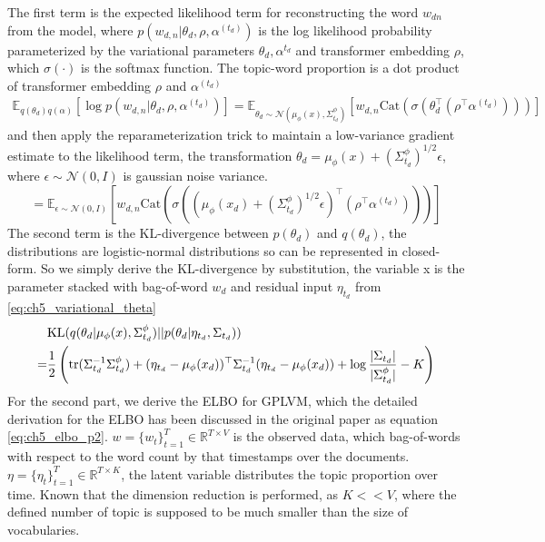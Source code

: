 The first term is the expected likelihood term for reconstructing the word $ w_{dn} $ from the model, where $ p(w_{d,n}|\theta_d, \rho,\alpha^{(t_d)}) $ is the log likelihood probability parameterized by the variational parameters $ \theta_d, \alpha^{t_d} $ and transformer embedding $ \rho $, which $ \sigma(\cdot) $ is the softmax function. The topic-word proportion is a dot product of transformer embedding $ \rho $ and $ \alpha^{(t_d)} $
\begin{align}
\mathbb{E}_{q(\theta_d)q(\alpha)}[\log p(w_{d,n}|\theta_d,\rho,\alpha^{(t_d)})]=\mathbb{E}_{\theta_d\sim\mathcal{N}(\mu_{\phi}(x),\Sigma^{\phi}_{t_d})}[w_{d,n}\text{Cat}\left(\sigma(\theta_d^\top(\rho^\top\alpha^{(t_d)}))\right)]
\end{align}
and then apply the reparameterization trick to maintain a low-variance gradient estimate to the likelihood term, the transformation $ \theta_d=\mu_{\phi}(x)+(\Sigma^{\phi}_{t_d})^{1/2}\epsilon $, where $ \epsilon\sim\mathcal{N}(0,I) $ is gaussian noise variance.
\begin{equation}\label{eq:ch5_reconstruction}
=\mathbb{E}_{\epsilon\sim\mathcal{N}(0,I)}\left[w_{d,n}\text{Cat}\left(\sigma((\mu_{\phi}(x_d)+(\Sigma^{\phi}_{t_d})^{1/2}\epsilon)^\top(\rho^\top\alpha^{(t_d)}))\right)\right]
\end{equation}
The second term is the KL-divergence between $ p(\theta_d) $ and $ q(\theta_d) $, the distributions are logistic-normal distributions so can be represented in closed-form. So we simply derive the KL-divergence by substitution,
the variable x is the parameter stacked with bag-of-word $ w_d $ and residual input $ \eta_{t_d} $ from \ref{eq:ch5_variational_theta}
\begin{align}\label{eq:ch5_kl_theta}
&\text{KL}(q(\theta_d|\mu_{\phi}(x),\Sigma^{\phi}_{t_d})||p(\theta_d|\eta_{t_d},\Sigma_{t_d}))\notag\\
=&\frac{1}{2}\left(\text{tr}(\Sigma_{t_d}^{-1}\Sigma_{t_d}^{\phi})+(\eta_{t_d}-\mu_{\phi}(x_d))^\top\Sigma_{t_d}^{-1}(\eta_{t_d}-\mu_{\phi}(x_d))+\log\frac{|\Sigma_{t_d}|}{|\Sigma^{\phi}_{t_d}|}-K\right)
\end{align}
For the second part, we derive the ELBO for GPLVM, which the detailed derivation for the ELBO has been discussed in the original paper \cite{titsias_bayesian_2010} as equation \ref{eq:ch5_elbo_p2}. $ w=\{w_t\}^{T}_{t=1}\in\mathbb{R}^{T\times V} $ is the observed data, which bag-of-words with respect to the word count by that timestamps over the documents. $ \eta=\{\eta_t\}^{T}_{t=1}\in\mathbb{R}^{T\times K} $, the latent variable distributes the topic proportion over time. Known that the dimension reduction is performed, as $ K<<V $, where the defined number of topic is supposed to be much smaller than the size of vocabularies.

